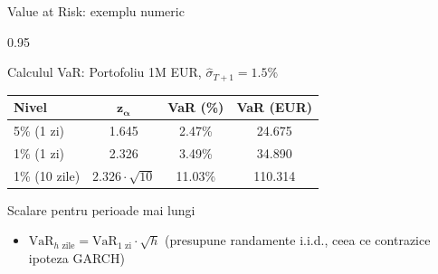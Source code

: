 \documentclass[9pt, aspectratio=169, t]{beamer}
\begin{document}
\begin{frame}{Value at Risk: exemplu numeric}
    \small
    \begin{cminipage}{0.95\textwidth}
        \begin{exampleblock}{Calculul VaR: Portofoliu 1M EUR, $\hat{\sigma}_{T+1} = 1.5\%$}
            \begin{center}
                \begin{tabular}{lccc}
                    \toprule
                    \textbf{Nivel} & $\bm{z_\alpha}$ & \textbf{VaR (\%)} & \textbf{VaR (EUR)} \\
                    \midrule
                    5\% (1 zi) & 1.645 & 2.47\% & 24.675 \\
                    1\% (1 zi) & 2.326 & 3.49\% & 34.890 \\
                    1\% (10 zile) & $2.326 \cdot \sqrt{10}$ & 11.03\% & 110.314 \\
                    \bottomrule
                \end{tabular}
            \end{center}
        \end{exampleblock}
        \vspace{-0.1cm}
        \begin{alertblock}{Scalare pentru perioade mai lungi}
            \begin{itemize}\setlength{\itemsep}{0pt}
                \item $\text{VaR}_{h\text{ zile}} = \text{VaR}_{1\text{ zi}} \cdot \sqrt{h}$ \quad (presupune randamente i.i.d., ceea ce contrazice ipoteza GARCH)
            \end{itemize}
        \end{alertblock}
    \end{cminipage}
\end{frame}
\end{document}
